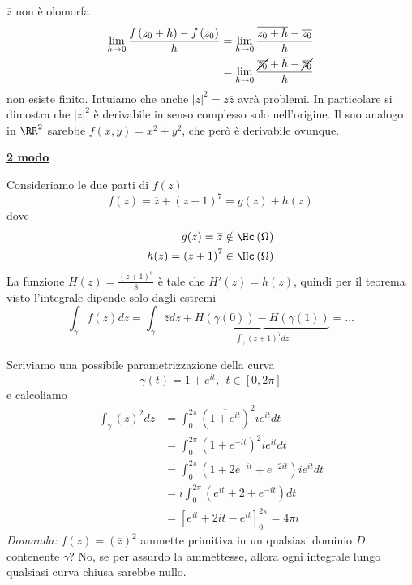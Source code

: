 \begin{rem}
$\overline{z}$ non è olomorfa
\begin{align*}
\lim\limits_{h\rightarrow 0}\frac{f\left(z_{0} + h\right) - f\left(z_{0}\right)}{h} & = \lim\limits_{h\rightarrow 0}\frac{\overline{z_{0} + h} - \overline{z_{0}}}{h}\\
 & = \lim\limits_{h\rightarrow 0}\frac{\cancel{\overline{z_{0}}} + \overline{h} - \cancel{\overline{z_{0}}}}{h}
\end{align*}
non esiste finito. Intuiamo che anche $\left| z\right|^{2} = z\overline{z}$ avrà problemi. In particolare si dimostra che $\left| z\right|^{2}$ è derivabile in senso complesso solo nell'origine. Il suo analogo in $\RR^{2}$ sarebbe $f\left(x, y\right) = x^{2} + y^{2}$, che però è derivabile ovunque.
\end{rem}
\textbf{\underline{2 modo}}

Consideriamo le due parti di $f(z)$
\begin{equation*}
f(z) = \overline{z} + \left(z + 1\right)^{7} = g(z) + h(z)
\end{equation*}
dove
\begin{equation*}
\begin{aligned}
g(z) = \overline{z} & \notin \Hc \left(\Omega \right)\\
h(z) = \left(z + 1\right)^{7} & \in \Hc \left(\Omega \right)
\end{aligned}
\end{equation*}
La funzione $H(z) = \frac{\left(z + 1\right)^{8}}{8}$ è tale che $H'(z) = h(z)$, quindi per il teorema visto l'integrale dipende solo dagli estremi
\begin{equation*}
\int\nolimits_{\gamma} f(z) dz = \int\nolimits_{\gamma}\overline{z} dz + \underbrace{H\left(\gamma (0)\right) - H\left(\gamma (1)\right)}_{\int\nolimits_{\gamma}\left(z + 1\right)^{7} dz} = \dotsc
\end{equation*}

\Soluzione

Scriviamo una possibile parametrizzazione della curva
\begin{equation*}
\gamma (t) = 1 + e^{it}, \ \ t\in \left[ 0, 2\pi \right]
\end{equation*}
e calcoliamo
\begin{align*}
\int\nolimits_{\gamma}\left(\overline{z}\right)^{2} dz & = \int\nolimits^{2\pi}_{0}\left(\overline{1 + e^{it}}\right)^{2} ie^{it} dt\\
 & = \int\nolimits^{2\pi}_{0}\left(1 + e^{- it}\right)^{2} ie^{it} dt\\
 & = \int\nolimits^{2\pi}_{0}\left(1 + 2e^{- it} + e^{- 2it}\right) ie^{it} dt\\
 & = i\int\nolimits^{2\pi}_{0}\left(e^{it} + 2 + e^{- it}\right) dt\\
 & = \left[ e^{it} + 2it - e^{it}\right]^{2\pi}_{0} = 4\pi i
\end{align*}
\textit{Domanda:} $f(z) = \left(\overline{z}\right)^{2}$ ammette primitiva in un qualsiasi dominio $D$ contenente $\gamma $? No, se per assurdo la ammettesse, allora ogni integrale lungo qualsiasi curva chiusa sarebbe nullo.

